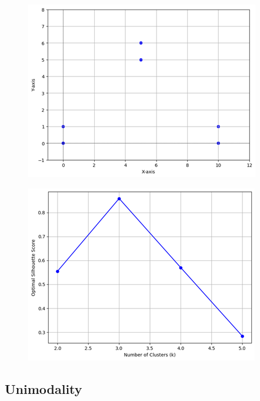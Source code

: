 \documentclass{article}
\begin{document}
\begin{figure}[htbp]
    \centering
    \begin{minipage}{0.45\linewidth}
        \centering
        \includegraphics[width=\linewidth]{triangleex.png}
        \label{fig:1}
    \end{minipage}
    \hfill  %
    \begin{minipage}{0.45\linewidth}
        \centering
        \includegraphics[width=\linewidth]{trianglesil.png}
        \label{fig:2}
    \end{minipage}
\end{figure}

\subsection*{Unimodality}
\end{document}
